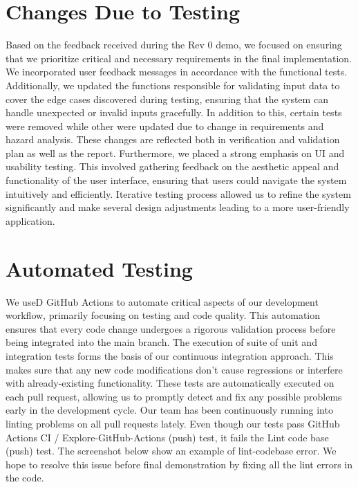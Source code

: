 \documentclass[12pt, titlepage]{article}
\begin{document}
\section{Changes Due to Testing}

Based on the feedback received during the Rev 0 demo, we focused on ensuring that we prioritize critical and necessary requirements in the final implementation. We incorporated user feedback messages in accordance with the functional tests. Additionally, we updated the functions responsible for validating input data to cover the edge cases discovered during testing, ensuring that the system can handle unexpected or invalid inputs gracefully. In addition to this, certain tests were removed while other were updated due to change in requirements and hazard analysis. These changes are reflected both in verification and validation plan as well as the report. Furthermore, we placed a strong emphasis on UI and usability testing. This involved gathering feedback on the aesthetic appeal and functionality of the user interface, ensuring that users could navigate the system intuitively and efficiently. Iterative testing process allowed us to refine the system significantly and make several design adjustments leading to a more user-friendly application.

\section{Automated Testing}

We useD GitHub Actions to automate critical aspects of our development workflow, primarily focusing on testing and code quality. This automation ensures that every code change undergoes a rigorous validation process before being integrated into the main branch. The execution of suite of unit and integration tests forms the basis of our continuous integration approach. This makes sure that any new code modifications don't cause regressions or interfere with already-existing functionality. These tests are automatically executed on each pull request, allowing us to promptly detect and fix any possible problems early in the development cycle. Our team has been continuously running into linting problems on all pull requests lately. Even though our tests pass GitHub Actions CI / Explore-GitHub-Actions (push) test, it fails the Lint code base (push) test. The screenshot below show an example of lint-codebase error. We hope to resolve this issue before final demonstration by fixing all the lint errors in the code.
\end{document}
